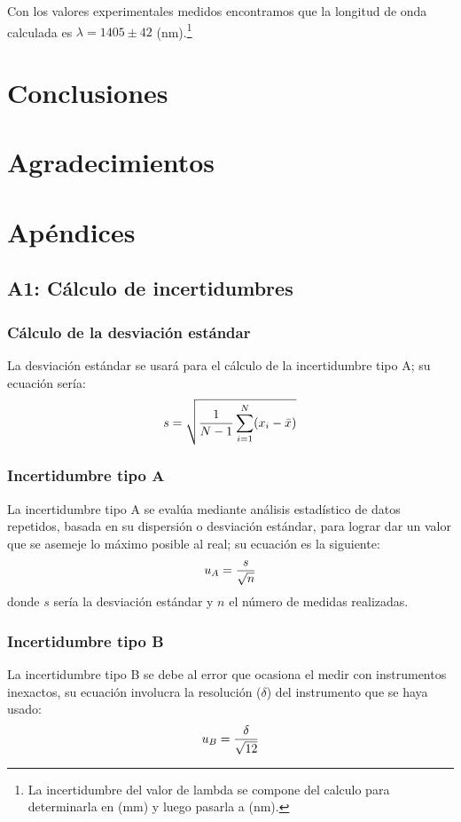 \documentclass[10pt,onecolumn]{article}
\begin{document}
Con los valores experimentales medidos encontramos que la longitud de onda calculada es $\lambda=1405 \pm 42$ (nm).\footnote{La incertidumbre del valor de lambda se compone del calculo para determinarla en (mm) y luego pasarla a (nm).}





\section{Conclusiones}


\section{Agradecimientos}

\newpage
\section{Apéndices}
\subsection{A1: Cálculo de incertidumbres} 
\subsubsection{Cálculo de la desviación estándar}
La desviación estándar se usará para el cálculo de la incertidumbre tipo A; su ecuación sería:
\begin{equation}\centering
    s = \sqrt{\dfrac{1}{N - 1} \sum_{i=1}^{N} (x_i - \bar{x})}
\end{equation}

\subsubsection{Incertidumbre tipo A}
La incertidumbre tipo A se evalúa mediante análisis estadístico de datos repetidos, basada en su dispersión o desviación estándar, para lograr dar un valor que se asemeje lo máximo posible al real; su ecuación es la siguiente:
\begin{equation}\centering
u_A = \dfrac{s}{\sqrt{n}}
\end{equation}
donde $s$ sería la desviación estándar y $n$ el número de medidas realizadas.

\subsubsection{Incertidumbre tipo B}
La incertidumbre tipo B se debe al error que ocasiona el medir con instrumentos inexactos, su ecuación involucra la resolución ($\delta$) del instrumento que se haya usado:
\begin{equation}\centering
    u_B = \dfrac{\delta}{\sqrt{12}}
\end{equation}
\end{document}
